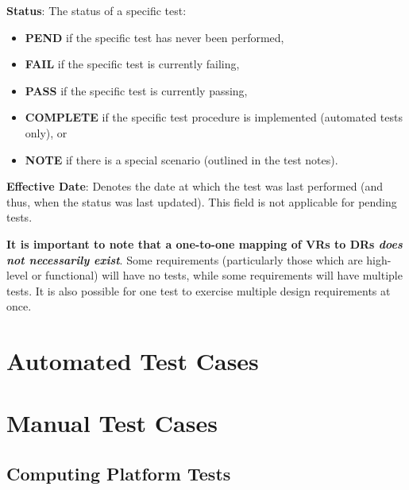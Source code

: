\documentclass[10pt,letterpaper]{article}
\begin{document}
\textbf{Status}: The status of a specific test:
\begin{itemize}
	\item \textbf{PEND} if the specific test has never been performed,
	\item \textbf{FAIL} if the specific test is currently failing,
	\item \textbf{PASS} if the specific test is currently passing,
	\item \textbf{COMPLETE} if the specific test procedure is implemented (automated tests only), or
	\item \textbf{NOTE} if there is a special scenario (outlined in the test notes).
\end{itemize}

\textbf{Effective Date}: Denotes the date at which the test was last performed (and thus, when the status was last updated). This field is not applicable for pending tests.

\textbf{It is important to note that a one-to-one mapping of VRs to DRs \textit{does not necessarily exist}}. Some requirements (particularly those which are high-level or functional) will have no tests, while some requirements will have multiple tests. It is also possible for one test to exercise multiple design requirements at once.

\newpage
\section{Automated Test Cases} \label{begintest}



%

\newpage
\section{Manual Test Cases}

\subsection{Computing Platform Tests}
\end{document}
